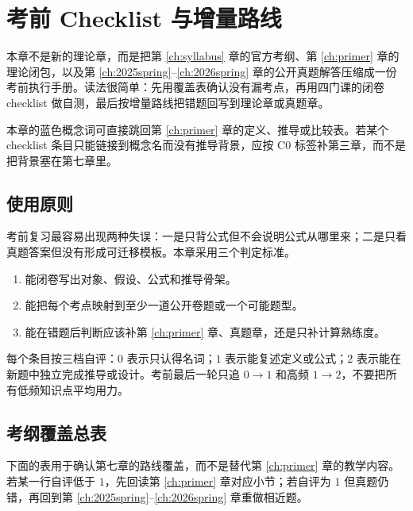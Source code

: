 \chapter{考前 Checklist 与增量路线}
\label{ch:checklists}

本章不是新的理论章，而是把第 \ref{ch:syllabus} 章的官方考纲、第 \ref{ch:primer} 章的理论闭包，以及第 \ref{ch:2025spring}--\ref{ch:2026spring} 章的公开真题解答压缩成一份考前执行手册。读法很简单：先用覆盖表确认没有漏考点，再用四门课的闭卷 checklist 做自测，最后按增量路线把错题回写到理论章或真题章。


本章的蓝色概念词可直接跳回第 \ref{ch:primer} 章的定义、推导或比较表。若某个 checklist 条目只能链接到概念名而没有推导背景，应按 C0 标签补第三章，而不是把背景塞在第七章里。

\section{使用原则}

考前复习最容易出现两种失误：一是只背公式但不会说明公式从哪里来；二是只看真题答案但没有形成可迁移模板。本章采用三个判定标准。

\begin{enumerate}
  \item 能闭卷写出对象、假设、公式和推导骨架。
  \item 能把每个考点映射到至少一道公开卷题或一个可能题型。
  \item 能在错题后判断应该补第 \ref{ch:primer} 章、真题章，还是只补计算熟练度。
\end{enumerate}

每个条目按三档自评：\(0\) 表示只认得名词；\(1\) 表示能复述定义或公式；\(2\) 表示能在新题中独立完成推导或设计。考前最后一轮只追 \(0\to1\) 和高频 \(1\to2\)，不要把所有低频知识点平均用力。

\section{考纲覆盖总表}

下面的表用于确认第七章的路线覆盖，而不是替代第 \ref{ch:primer} 章的教学内容。若某一行自评低于 \(1\)，先回读第 \ref{ch:primer} 章对应小节；若自评为 \(1\) 但真题仍错，再回到第 \ref{ch:2025spring}--\ref{ch:2026spring} 章重做相近题。


